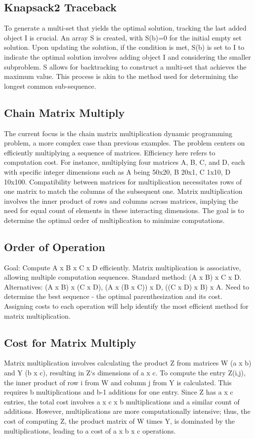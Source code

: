 \subsection*{Knapsack2  Traceback}
To generate a multi-set that yields the optimal solution, tracking the last added object I is crucial.
An array S is created, with S(b)=0 for the initial empty set solution.
Upon updating the solution, if the condition is met, S(b) is set to I to indicate the optimal solution involves adding object I and considering the smaller subproblem.
S allows for backtracking to construct a multi-set that achieves the maximum value.
This process is akin to the method used for determining the longest common sub-sequence.

\subsection*{Chain Matrix Multiply}
The current focus is the chain matrix multiplication dynamic programming problem, a more complex case than previous examples.
The problem centers on efficiently multiplying a sequence of matrices.
Efficiency here refers to computation cost.
For instance, multiplying four matrices A, B, C, and D, each with specific integer dimensions such as A being 50x20, B 20x1, C 1x10, D 10x100.
Compatibility between matrices for multiplication necessitates rows of one matrix to match the columns of the subsequent one.
Matrix multiplication involves the inner product of rows and columns across matrices, implying the need for equal count of elements in these interacting dimensions.
The goal is to determine the optimal order of multiplication to minimize computations.

\subsection*{Order of Operation}
Goal: Compute A x B x C x D efficiently.
Matrix multiplication is associative, allowing multiple computation sequences.
Standard method: (A x B) x C x D\@.
Alternatives: (A x B) x (C x D), (A x (B x C)) x D, ((C x D) x B) x A\@.
Need to determine the best sequence - the optimal parenthesization and its cost.
Assigning costs to each operation will help identify the most efficient method for matrix multiplication.

\subsection*{Cost for Matrix Multiply}
Matrix multiplication involves calculating the product Z from matrices W (a x b) and Y (b x c), resulting in Z`s dimensions of a x c.
To compute the entry Z(i,j), the inner product of row i from W and column j from Y is calculated.
This requires b multiplications and b-1 additions for one entry.
Since Z has a x c entries, the total cost involves a x c x b multiplications and a similar count of additions.
However, multiplications are more computationally intensive; thus, the cost of computing Z, the product matrix of W times Y, is dominated by the multiplications, leading to a cost of a x b x c operations.

